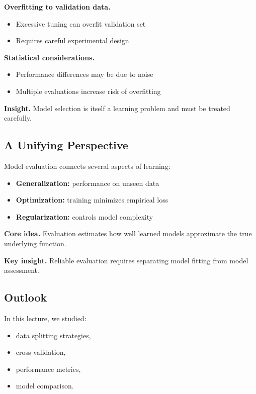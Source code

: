 \medskip

\noindent
\textbf{Overfitting to validation data.}
\begin{itemize}
    \item Excessive tuning can overfit validation set
    \item Requires careful experimental design
\end{itemize}

\medskip

\noindent
\textbf{Statistical considerations.}
\begin{itemize}
    \item Performance differences may be due to noise
    \item Multiple evaluations increase risk of overfitting
\end{itemize}

\medskip

\noindent
\textbf{Insight.}  
Model selection is itself a learning problem and must be treated carefully.

\subsection{A Unifying Perspective}

Model evaluation connects several aspects of learning:

\begin{itemize}
    \item \textbf{Generalization:} performance on unseen data
    \item \textbf{Optimization:} training minimizes empirical loss
    \item \textbf{Regularization:} controls model complexity
\end{itemize}

\medskip

\noindent
\textbf{Core idea.}  
Evaluation estimates how well learned models approximate the true underlying function.

\medskip

\noindent
\textbf{Key insight.}  
Reliable evaluation requires separating model fitting from model assessment.

\subsection{Outlook}

In this lecture, we studied:

\begin{itemize}
    \item data splitting strategies,
    \item cross-validation,
    \item performance metrics,
    \item model comparison.
\end{itemize}


